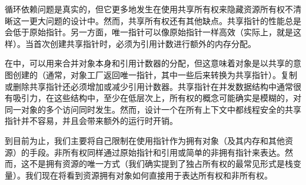 循环依赖问题是真实的，但它更多地发生在使用共享所有权来隐藏资源所有权不清晰这一更大问题的设计中。然而，共享所有权还有其他缺点。共享指针的性能总是会低于原始指针。另一方面，唯一指针可以像原始指针一样高效（实际上，就是这样）。当首次创建共享指针时，必须为引用计数进行额外的内存分配。

在\cpp[11]中，可以用来合并对象本身和引用计数器的分配，但这意味着对象是以共享的意图创建的（通常，对象工厂返回唯一指针，其中一些后来转换为共享指针）。复制或删除共享指针还必须增加或减少引用计数器。共享指针在并发数据结构中通常很有吸引力，在这些结构中，至少在低层次上，所有权的概念可能确实是模糊的，对同一对象的多个访问同时发生。然而，设计一个在所有上下文中都线程安全的共享指针并不容易，并且会带来额外的运行时开销。

到目前为止，我们主要将自己限制在使用指针作为拥有对象（及其内存和其他资源）的手段。非所有权同样通过原始指针和引用或简单的非拥有指针来表达。然而，这不是拥有资源的唯一方式（我们确实提到了独占所有权的最常见形式是栈变量）。我们现在将看到资源拥有对象如何直接用于表达所有权和非所有权。

